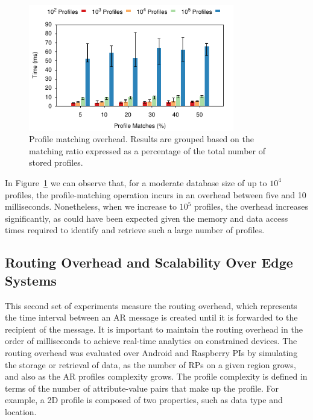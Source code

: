\begin{figure}[htb!]
  \centering
    \includegraphics[width=0.8\textwidth]{Figures/profileQuery.pdf}
  \caption{Profile matching overhead. Results are grouped based on the matching ratio expressed as a percentage of the total number of stored profiles.} \label{fig:profileQuery}
\end{figure}

In Figure~\ref{fig:profileQuery} we can observe that, for a moderate database size of up to $10^4$ profiles, the profile-matching operation incurs in an overhead between five and 10 milliseconds. Nonetheless, when we increase to $10^5$ profiles, the overhead increases significantly, as could have been expected given the memory and data access times required to identify and retrieve such a large number of profiles.

\subsection{Routing Overhead and Scalability Over Edge Systems}

This second set of experiments measure the routing overhead, which represents the time interval between an AR message is created until it is forwarded to the recipient of the message. It is important to maintain the routing overhead in the order of milliseconds to achieve real-time analytics on constrained devices. The routing overhead was evaluated over Android and Raspberry PIs by simulating the storage or retrieval of data, as the number of RPs on a given region grows, and also as the AR profiles complexity grows. The profile complexity is defined in terms of the number of attribute-value pairs that make up the profile. For example, a 2D profile is composed of two properties, such as data type and location.

